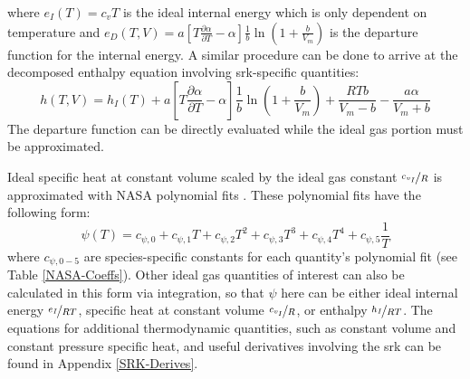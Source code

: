 where $e_I(T)=c_vT$ is the ideal internal energy which is only dependent on temperature and $e_D(T,V) = a \left[ T \tfrac{\partial \alpha}{\partial T} - \alpha \right] \tfrac{1}{b}\ln\left( 1 + \tfrac{b}{V_m} \right)$ is the departure function for the internal energy. A similar procedure can be done to arrive at the decomposed enthalpy equation involving \gls{srk}-specific quantities:
\begin{equation} \label{thermo_enthalpy}
h(T,V) = h_I(T) +  a \left[ T \dfrac{\partial \alpha}{\partial T} - \alpha \right] \dfrac{1}{b}\ln\left( 1 + \dfrac{b}{V_m} \right) + \dfrac{RTb}{V_m - b} - \dfrac{a \alpha}{V_m + b}
\end{equation}
The departure function can be directly evaluated while the ideal gas portion must be approximated.

Ideal specific heat at constant volume scaled by the ideal gas constant $\nicefrac{c_{v_I}}{R}$ is approximated with NASA polynomial fits \cite{NASAPoly}. These polynomial fits have the following form:
\begin{equation} \label{NASA_poly}
\psi(T) = c_{\psi, 0} + c_{\psi, 1}T + c_{\psi, 2}T^2 + c_{\psi, 3}T^3 + c_{\psi, 4}T^4  + c_{\psi, 5}\dfrac{1}{T}
\end{equation}
where $c_{\psi,0-5}$ are species-specific constants for each quantity's polynomial fit (see Table \ref{NASA-Coeffs}). Other ideal gas quantities of interest can also be calculated in this form via integration, so that $\psi$ here can be either ideal internal energy $\nicefrac{e_I}{RT}$, specific heat at constant volume $\nicefrac{c_{v_I}}{R}$, or enthalpy $\nicefrac{h_I}{RT}$. 
The equations for additional thermodynamic quantities, such as constant volume and constant pressure specific heat, and useful derivatives involving the \gls{srk} can be found in Appendix \ref{SRK-Derives}. 





